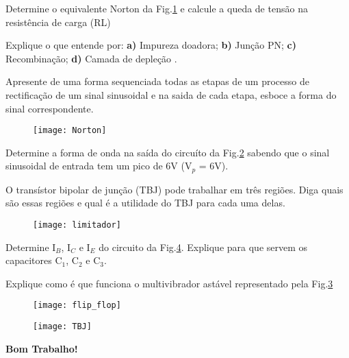 \documentclass[11pt,a4paper,titlepage]{article}
\begin{document}
\begin{enumerate}

\begin{minipage}[c]{12cm}
\item Determine o equivalente Norton da Fig.\ref{f2} e calcule a queda de tensão na resistência de carga (RL)

 \item Explique o que entende por: \textbf{a)} Impureza doadora; \textbf{b)} Junção PN; \textbf{c)} Recombinação; \textbf{d)} Camada de depleção .

\item Apresente de uma forma sequenciada todas as etapas de um processo de rectificação de um sinal sinusoidal e na saida de cada etapa, esboce a forma do sinal correspondente.

\end{minipage}\hfill
\begin{minipage}[c]{5cm}
 \begin{figure}[H]
   \centering
   \texttt{[image: Norton]}
   \caption{}
   \label{f2}
   \end{figure}
\end{minipage}

\begin{minipage}[c]{12cm}
\item Determine a forma de onda na sa\'ida do circuíto da Fig.\ref{f3} sabendo que o sinal sinusoidal de entrada tem um pico de 6V (V$_p$ = 6V).
\item O transístor bipolar de junção (TBJ) pode trabalhar em três regiões. Diga quais são essas regiões e qual é a utilidade do TBJ para cada uma delas.
\end{minipage}\hfill
\begin{minipage}[c]{5cm}
 \begin{figure}[H]
   \centering
   \texttt{[image: limitador]}
   \caption{}
   \label{f3}
   \end{figure}
\end{minipage}


\begin{minipage}[c]{12cm}
\item Determine I$_B$, I$_C$ e I$_E$ do circuito da Fig.\ref{f5}. Explique para que servem os capacitores C$_1$, C$_2$ e C$_3$.
\item Explique como \'e que funciona o multivibrador ast\'avel representado pela Fig.\ref{flip}

 \begin{figure}[H]
   \centering
   \texttt{[image: flip\_flop]}
   \caption{}
   \label{flip}
   \end{figure}
\end{minipage}\hfill
\begin{minipage}[c]{5cm}
 \begin{figure}[H]
   \centering
   \texttt{[image: TBJ]}
   \caption{}
   \label{f5}
   \end{figure}

\end{minipage}

\end{enumerate}
\vspace{1.0cm}

\Huge \textbf{Bom Trabalho!}
\end{document}
